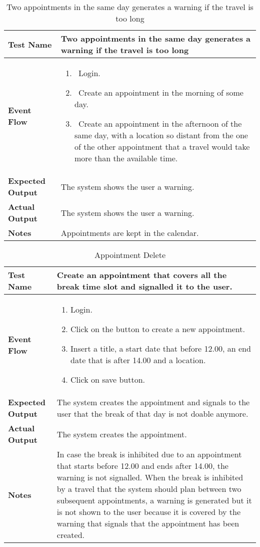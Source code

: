 \begin{table}[h]	
\centering
\def\arraystretch{1.5}
\begin{tabular}{|m{7cm}|m{7cm}|}
	\hline
	\textbf{Test Name}            &  Two appointments in the same day generates a warning if the travel is too long  \\ \hline
	\textbf{Event Flow}             &   
		\begin{enumerate}
			\item~Login.
			\item~Create an appointment in the morning of some day.
			\item~Create an appointment in the afternoon of the same day, with a location so distant from the one of the other appointment that a travel would take more than the available time.
		\end{enumerate}
	\\ \hline
	\textbf{Expected Output}  &  The system shows the user a warning.   \\ \hline
	\textbf{Actual Output}       &   The system shows the user a warning.  \\ \hline
	\textbf{Notes} &  Appointments are kept in the calendar.   \\ \hline
\end{tabular}
\caption{Two appointments in the same day generates a warning if the travel is too long}
\end{table}


\begin{table}[h]	
	\centering
	\def\arraystretch{1.5}
	\begin{tabular}{|m{7cm}|m{7cm}|}
		\hline
		\textbf{Test Name}            & Create an appointment that covers all the break time slot and signalled it to the user.\\ \hline
		\textbf{Event Flow}             & 
		\begin{enumerate}
			\item Login.
			\item Click on the button to create a new appointment.
			\item Insert a title, a start date that before 12.00, an end date that is after 14.00 and a location.
			\item Click on save button.
		\end{enumerate} \\ \hline
		\textbf{Expected Output}  &  The system creates the appointment and signals to the user that the break of that day is not doable anymore.  \\ \hline
		\textbf{Actual Output}       & The system creates the appointment.   \\ \hline
		\textbf{Notes} & In case the break is inhibited due to an appointment that starts before 12.00 and ends after 14.00, the warning is not signalled. When the break is inhibited by a travel that the system should plan between two subsequent appointments, a warning is generated but it is not shown to the user because it is covered by the warning that signals that the appointment has been created. \\ \hline
	\end{tabular}
	\caption{Appointment Delete}
\end{table}


